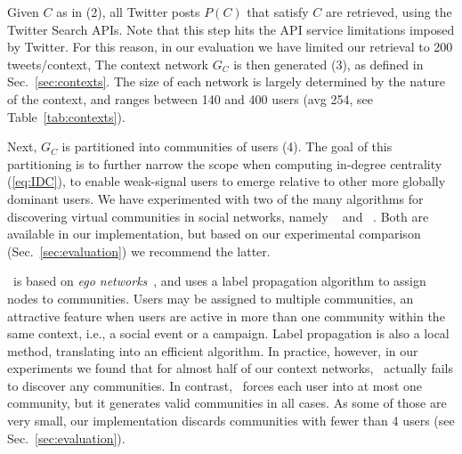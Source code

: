 %
Given $C$ as in (2), all Twitter posts $P(C)$ that satisfy $C$ are retrieved, using the Twitter Search APIs.
Note that this step hits the API service limitations imposed by Twitter. 
For this reason, in our evaluation we have limited our retrieval to 200 tweets/context, 
%
The context network $G_C$ is then generated (3), as defined in Sec.~\ref{sec:contexts}.  %
The size of each network is largely determined by the nature of the context, and  ranges between 140 and 400 users (avg 254, see Table~\ref{tab:contexts}).


Next, $G_C$  is partitioned into communities of users (4).
The goal of this partitioning is to further narrow the scope when computing in-degree centrality (\ref{eq:IDC}), 
to enable weak-signal users to emerge relative to other more globally dominant users.
%
We have experimented with two of the many algorithms for discovering virtual communities in social networks, namely \demon~\cite{Coscia:2012:DLD:2339530.2339630} and  \infomap~\cite{INFOMAP}. 
Both are available in our implementation, but based on our experimental comparison (Sec.~\ref{sec:evaluation}) we recommend the latter.

\demon~is based on \textit{ego networks}~\cite{Arnaboldi2013}, and uses a label propagation algorithm to assign nodes to communities.  
Users may be assigned to multiple communities, an attractive feature when users are active in more than one community within the same context, i.e., a social event or a campaign.
Label propagation is also a local method, translating into an efficient algorithm.
In practice, however, in our experiments we found that for almost half of our context networks, \demon~actually fails to discover any communities.
%
In contrast, \infomap~forces each user into at most one community, but it generates valid communities in all cases. 
As some of those are very small, our  implementation discards communities with fewer than 4 users (see Sec.~\ref{sec:evaluation}).
%


